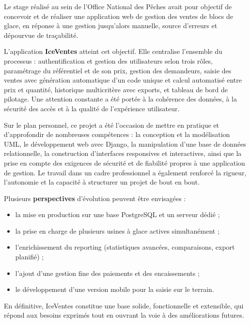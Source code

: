Le stage réalisé au sein de l'Office National des Pêches avait pour objectif de concevoir et de réaliser une application web de gestion des ventes de blocs de glace, en réponse à une gestion jusqu'alors manuelle, source d'erreurs et dépourvue de traçabilité.

L'application \textbf{IceVentes} atteint cet objectif. Elle centralise l'ensemble du processus : authentification et gestion des utilisateurs selon trois rôles, paramétrage du référentiel et de son prix, gestion des demandeurs, saisie des ventes avec génération automatique d'un code unique et calcul automatisé entre prix et quantité, historique multicritère avec exports, et tableau de bord de pilotage. Une attention constante a été portée à la cohérence des données, à la sécurité des accès et à la qualité de l'expérience utilisateur.

Sur le plan personnel, ce projet a été l'occasion de mettre en pratique et d'approfondir de nombreuses compétences : la conception et la modélisation UML, le développement web avec Django, la manipulation d'une base de données relationnelle, la construction d'interfaces responsives et interactives, ainsi que la prise en compte des exigences de sécurité et de fiabilité propres à une application de gestion. Le travail dans un cadre professionnel a également renforcé la rigueur, l'autonomie et la capacité à structurer un projet de bout en bout.

Plusieurs \textbf{perspectives} d'évolution peuvent être envisagées :

\begin{itemize}
  \item la mise en production sur une base PostgreSQL et un serveur dédié ;
  \item la prise en charge de plusieurs usines à glace actives simultanément ;
  \item l'enrichissement du reporting (statistiques avancées, comparaisons, export planifié) ;
  \item l'ajout d'une gestion fine des paiements et des encaissements ;
  \item le développement d'une version mobile pour la saisie sur le terrain.
\end{itemize}

En définitive, IceVentes constitue une base solide, fonctionnelle et extensible, qui répond aux besoins exprimés tout en ouvrant la voie à des améliorations futures.
